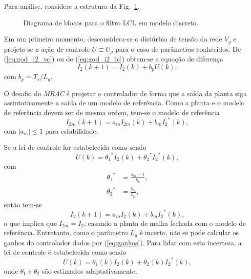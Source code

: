     Para análise, considere a estrutura da Fig.~\ref{fig:LCL_discreto}.
    \begin{figure}[htb]
        \centering{
            \def\svgwidth{\textwidth}
            }
        \renewcommand\figurename{Fig.}
        \caption{Diagrama de blocos para o filtro LCL em modelo discreto.}
        \label{fig:LCL_discreto}
    \end{figure}

    Em um primeiro momento, desconsidera-se o distúrbio de tensão da rede $V_g$ e projeta-se a ação de controle $U \equiv U_p$ para o caso de parâmetros conhecidos. %
    De (\ref{eq:god_i2_vc}) ou de (\ref{eq:god_i2_ic}) obtem-se a equação de diferença
    \begin{equation}
        I_2 (k + 1) = I_2 (k) + b_p U (k) \text{,}
        \label{eq:diferenca}
    \end{equation}
    com $b_p = T_s / L_g$.

    O desafio do \emph{MRAC} é projetar o controlador de forma que a saída da planta siga assintoticamente a saída de um modelo de referência. Como a planta e o modelo de referência devem ser de mesma ordem, tem-se o modelo de referência
    \begin{equation}
        I_{2m}(k + 1) = a_m I_{2m}(k) + b_m {I_2}^* (k) \text{,}
        \label{eq:modelo_referencia}
    \end{equation}
    com $| a_m | \le 1$ para estabilidade.

    Se a lei de controle for estabelecida como sendo
    \begin{equation}
        U (k) = {\theta_1}^* I_2 (k) + {\theta_2}^* {I_2}^* (k) \text{,}
    \end{equation}
    com
    \begin{equation}
        \begin{split}
            {\theta_1}^* & = \frac{a_m - 1}{b_p} \text{,}\\
            {\theta_2}^* & = \frac{b_m}{b_p} \text{,}
        \end{split}
        \label{eq:ganhos}
    \end{equation}
    então tem-se
    \begin{equation}
        I_2 (k + 1) = a_m I_2 (k) + b_m {I_2}^* (k) \text{,}
    \end{equation}
    o que implica que $I_{2m} = I_2$, casando a planta de malha fechada com o modelo de referência. Entretanto, como o parâmetro $L_g$ é incerto, não se pode calcular os ganhos do controlador dados por (\ref{eq:ganhos}). Para lidar com esta incerteza, a lei de controle é estabelecida como sendo
    \begin{equation}
        U (k) = \theta_1 (k) I_2 (k) + \theta_2 (k) {I_2}^* (k) \text{,}
        \label{eq:controle_incerteza}
    \end{equation}
    onde $\theta_1$ e $\theta_2$ são estimados adaptativamente.

